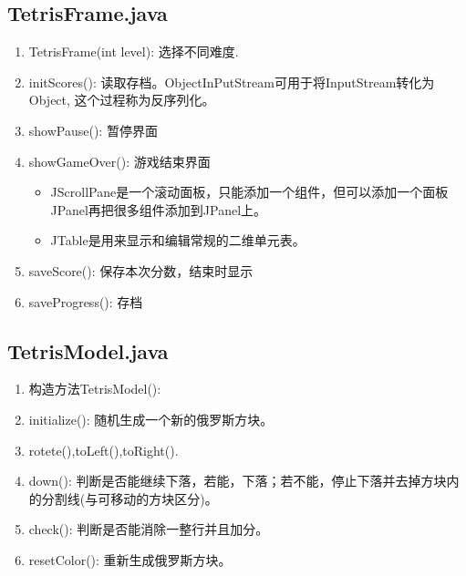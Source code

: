 \documentclass{ctexart}
\begin{document}
\subsection{TetrisFrame.java}
\begin{enumerate}
    \item TetrisFrame(int level): 选择不同难度.
    \item initScores(): 读取存档。ObjectInPutStream可用于将InputStream转化为Object, 这个过程称为反序列化。
    \item showPause(): 暂停界面
    \item showGameOver(): 游戏结束界面
    \begin{itemize}
        \item JScrollPane是一个滚动面板，只能添加一个组件，但可以添加一个面板JPanel再把很多组件添加到JPanel上。
        \item JTable是用来显示和编辑常规的二维单元表。
    \end{itemize}
    \item saveScore(): 保存本次分数，结束时显示
    \item saveProgress(): 存档
\end{enumerate}

\subsection{TetrisModel.java}
\begin{enumerate}
    \item 构造方法TetrisModel(): 
    \item initialize(): 随机生成一个新的俄罗斯方块。
    \item rotete(),toLeft(),toRight().
    \item down(): 判断是否能继续下落，若能，下落；若不能，停止下落并去掉方块内的分割线(与可移动的方块区分)。
    \item check(): 判断是否能消除一整行并且加分。
    \item resetColor(): 重新生成俄罗斯方块。
\end{enumerate}
\end{document}
